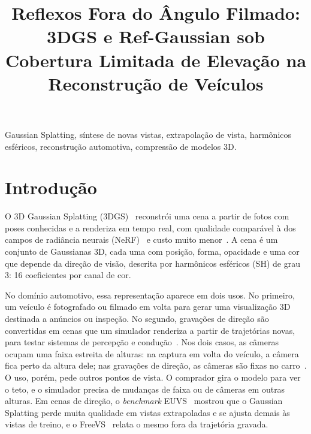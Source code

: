 \documentclass[conference]{IEEEtran}
\begin{document}
\title{Reflexos Fora do Ângulo Filmado: 3DGS e Ref-Gaussian sob Cobertura Limitada de Elevação na Reconstrução de Veículos}

\author{
\and
{}
}

\maketitle



\begin{IEEEkeywords}
Gaussian Splatting, síntese de novas vistas, extrapolação de vista, harmônicos esféricos, reconstrução automotiva, compressão de modelos 3D.
\end{IEEEkeywords}

\section{Introdução}\label{sec:intro}

O 3D Gaussian Splatting (3DGS)~\cite{kerbl2023} reconstrói uma cena a partir de fotos com poses conhecidas e a renderiza em tempo real, com qualidade comparável à dos campos de radiância neurais (NeRF)~\cite{mildenhall2022nerf} e custo muito menor~\cite{fei2024survey}. A cena é um conjunto de Gaussianas 3D, cada uma com posição, forma, opacidade e uma cor que depende da direção de visão, descrita por harmônicos esféricos (SH) de grau 3: 16 coeficientes por canal de cor.

No domínio automotivo, essa representação aparece em dois usos. No primeiro, um veículo é fotografado ou filmado em volta para gerar uma visualização 3D destinada a anúncios ou inspeção. No segundo, gravações de direção são convertidas em cenas que um simulador renderiza a partir de trajetórias novas, para testar sistemas de percepção e condução~\cite{yang2023unisim,yan2024streetgs,zhou2024drivinggaussian,chen2025omnire}. Nos dois casos, as câmeras ocupam uma faixa estreita de alturas: na captura em volta do veículo, a câmera fica perto da altura dele; nas gravações de direção, as câmeras são fixas no carro~\cite{sun2020waymo}. O uso, porém, pede outros pontos de vista. O comprador gira o modelo para ver o teto, e o simulador precisa de mudanças de faixa ou de câmeras em outras alturas. Em cenas de direção, o \textit{benchmark} EUVS~\cite{han2025euvs} mostrou que o Gaussian Splatting perde muita qualidade em vistas extrapoladas e se ajusta demais às vistas de treino, e o FreeVS~\cite{wang2025freevs} relata o mesmo fora da trajetória gravada.
\end{document}
